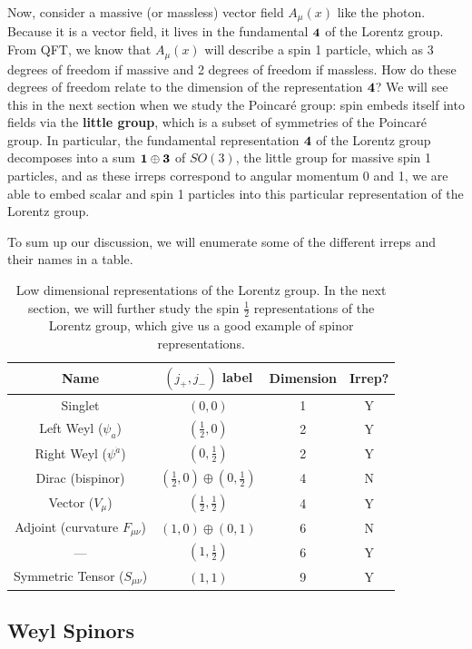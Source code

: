 \documentclass[11pt, oneside]{article}   	%
\theoremstyle{definition}
\begin{document}
Now, consider a massive (or massless) vector field $A_\mu(x)$ like the photon. Because it is a vector field, it lives in the 
fundamental $\bf 4$ of the Lorentz group. From QFT, we know that $A_\mu(x)$ will describe a spin 1 particle, which as 3 
degrees of freedom if massive and 2 degrees of freedom if massless. How do these degrees of freedom relate to the 
dimension of the representation $\bf 4$? We will see this in the next section when we study the Poincar\'e group: spin 
embeds itself into fields via the \textbf{little group}, which is a subset of symmetries of the Poincar\'e group. In particular, the 
fundamental representation $\bf 4$ of the Lorentz group decomposes into a sum $\bf 1\oplus 3$ of $SO(3)$, the little group 
for massive spin 1 particles, and as these irreps correspond to angular momentum 0 and 1, we are able to embed scalar and 
spin 1 particles into this particular representation of the Lorentz group. 

To sum up our discussion, we will enumerate some of the different irreps and their names in a table.
\begin{table}[H]
	\centering
	\begin{tabular}{ | c | c | c | c | }
		\hline
		Name & $(j_+, j_-)$ label & Dimension & Irrep? \\
		\hline
		Singlet & $(0, 0)$ & 1 & Y \\
		Left Weyl ($\psi_a$) & $(\frac{1}{2}, 0)$ & 2 & Y \\
		Right Weyl ($\psi^{\dot a}$) & $(0, \frac{1}{2})$ & 2 & Y \\
		Dirac (bispinor) & $(\frac{1}{2}, 0)\oplus (0, \frac{1}{2})$ & 4 & N \\
		Vector ($V_\mu$) & $(\frac{1}{2}, \frac{1}{2})$ & 4 & Y \\
		Adjoint (curvature $F_{\mu\nu}$) & $(1, 0)\oplus (0, 1)$ & 6 & N \\
		--- & $(1, \frac{1}{2})$ & 6 & Y \\
		Symmetric Tensor ($S_{\mu\nu}$) & $(1, 1)$ & 9 & Y \\ 
		\hline
	\end{tabular}
	\caption{Low dimensional representations of the Lorentz group. In the next section, we will further study the spin $\frac{1}{2}$ 
	representations of the Lorentz group, which give us a good example of spinor representations.}
\end{table}
 
 \subsection{Weyl Spinors}
 
\end{document}
